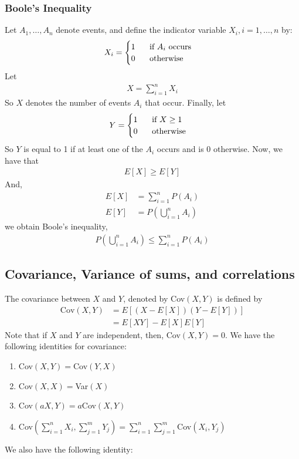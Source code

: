 \documentclass[a4paper]{article}
\begin{document}
\subsubsection{Boole's Inequality}
Let $A_1,\dots,A_n$ denote events, and define the indicator variable $X_i, i=1,\dots,n$ by:
\begin{align}
  X_i=
  \begin{cases}
    1 \hspace{.5 cm} \text{ if }A_i \text{ occurs} \\
    0 \hspace{.5 cm} \text{ otherwise}
  \end{cases}
\end{align}
Let
\begin{align}
  X= \sum_{i=1}^{n}X_i
\end{align}
So $X$ denotes the number of events $A_i$ that occur. Finally, let
\begin{align}
  Y=
  \begin{cases}
    1 \hspace{.5 cm} \text{ if } X \geq 1 \\
    0 \hspace{.5 cm} \text{ otherwise}
  \end{cases}
\end{align}
So $Y$ is equal to 1 if at least one of the $A_i$ occurs and is 0 otherwise. Now, we have that
\begin{align}
  E[X] \geq E[Y]
\end{align}
And,
\begin{align}
  E[X] &= \sum_{i=1}^{n}P(A_i) \\
  E[Y] &= P(\bigcup_{i=1}^n A_i)
\end{align}
we obtain Boole's inequality,
\begin{align}
  P(\bigcup_{i=1}^n A_i) \leq \sum_{i=1}^{n}P(A_i)
\end{align}
\subsection{Covariance, Variance of sums, and correlations} %
\label{sub:Covariance, Variance of sums, and correlations}
The covariance between $X$ and $Y$, denoted by Cov$(X,Y)$ is defined by
\begin{align}
  \text{Cov}(X,Y) &= E[(X-E[X])(Y-E[Y])] \\
  & = E[XY] - E[X]E[Y] 
\end{align}
Note that if $X$ and $Y$ are independent, then, Cov$(X,Y)=0$. We have the following identities for covariance:
\begin{enumerate}
  \item Cov$(X,Y)=$Cov$(Y,X)$
  \item Cov$(X,X)=$Var$(X)$
  \item Cov$(aX,Y)=a$Cov$(X,Y)$
  \item Cov$(\sum_{i=1}^n X_i,\sum_{j=1}^{m} Y_j)=\sum_{i=1}^{n}\sum_{j=1}^{m}$Cov$(X_i,Y_j)$
\end{enumerate}
We also have the following identity:
\end{document}
